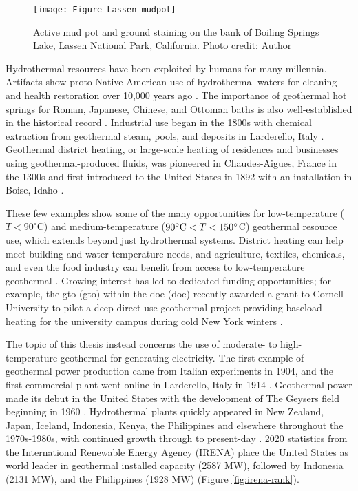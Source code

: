 \begin{figure}
\centering
\texttt{[image: Figure-Lassen-mudpot]}
\caption[Mud pot, Lassen National Park]{Active mud pot and ground staining on the bank of Boiling Springs Lake, Lassen National Park, California. Photo credit: Author}
\label{fig:lassen-mudpot}
\end{figure}

Hydrothermal resources have been exploited by humans for many millennia. Artifacts show proto-Native American use of hydrothermal waters for cleaning and health restoration over 10,000 years ago \citep{doe_history_2021}. The importance of geothermal hot springs for Roman, Japanese, Chinese, and Ottoman baths is also well-established in the historical record \citep{lund_characteristics_2007}. Industrial use began in the 1800s with chemical extraction from geothermal steam, pools, and deposits in Larderello, Italy \citep[p.\ 251]{dipippo_geothermal_2012}. Geothermal district heating, or large-scale heating of residences and businesses using geothermal-produced fluids, was pioneered in Chaudes-Aigues, France in the 1300s and first introduced to the United States in 1892 with an installation in Boise, Idaho \citep{lund_characteristics_2007}.

These few examples show some of the many opportunities for low-temperature ($T<90^\circ$C) and medium-temperature ($90^\circ{\rm C}<T<150^\circ$C) geothermal resource use, which extends beyond just hydrothermal systems. District heating can help meet building and water temperature needs, and agriculture, textiles, chemicals, and even the food industry can benefit from access to low-temperature geothermal \citep{doe_low_2021, liu_overview_2015}. Growing interest has led to dedicated funding opportunities; for example, the \acrlong{gto} (\acrshort{gto}) within the \acrlong{doe} (\acrshort{doe}) recently awarded a grant to Cornell University to pilot a deep direct-use geothermal project providing baseload heating for the university campus during cold New York winters \citep{hamm_geothermal_2021,tester_integrating_2015}.

The topic of this thesis instead concerns the use of moderate- to high-temperature geothermal for generating electricity. The first example of geothermal power production came from Italian experiments in 1904, and the first commercial plant went online in Larderello, Italy in 1914 \citep[p.\ 251]{dipippo_geothermal_2012}. Geothermal power made its debut in the United States with the development of The Geysers field beginning in 1960 \citep{tester_future_2006}. Hydrothermal plants quickly appeared in New Zealand, Japan, Iceland, Indonesia, Kenya, the Philippines and elsewhere throughout the 1970s-1980s, with continued growth through to present-day \citep{lund_characteristics_2007}. 2020 statistics from the International Renewable Energy Agency (IRENA) place the United States as world leader in geothermal installed capacity (2587 MW), followed by Indonesia (2131 MW), and the Philippines (1928 MW) \citep{irena_country_2021} (Figure \ref{fig:irena-rank}). 

